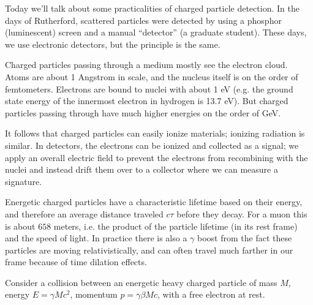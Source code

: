 Today we'll talk about some practicalities of charged particle detection. In the days of Rutherford, scattered particles were detected by using a phosphor (luminescent) screen and a manual ``detector'' (a graduate student). These days, we use electronic detectors, but the principle is the same.

Charged particles passing through a medium mostly see the electron cloud. Atoms are about 1 Angstrom in scale, and the nucleus itself is on the order of femtometers. Electrons are bound to nuclei with about 1 eV (e.g. the ground state energy of the innermost electron in hydrogen is 13.7 eV). But charged particles passing through have much higher energies on the order of GeV.

It follows that charged particles can easily ionize materials; ionizing radiation is similar. In detectors, the electrons can be ionized and collected as a signal; we apply an overall electric field to prevent the electrons from recombining with the nuclei and instead drift them over to a collector where we can measure a signature.

Energetic charged particles have a characteristic lifetime based on their energy, and therefore an average distance traveled $c\tau$ before they decay. For a muon this is about $658$ meters, i.e. the product of the particle lifetime (in its rest frame) and the speed of light. In practice there is also a $\gamma$ boost from the fact these particles are moving relativistically, and can often travel much farther in our frame because of time dilation effects.

Consider a collision between an energetic heavy charged particle of mass $M$, energy $E=\gamma Mc^2$, momentum $p = \gamma \beta Mc$, with a free electron at rest. 